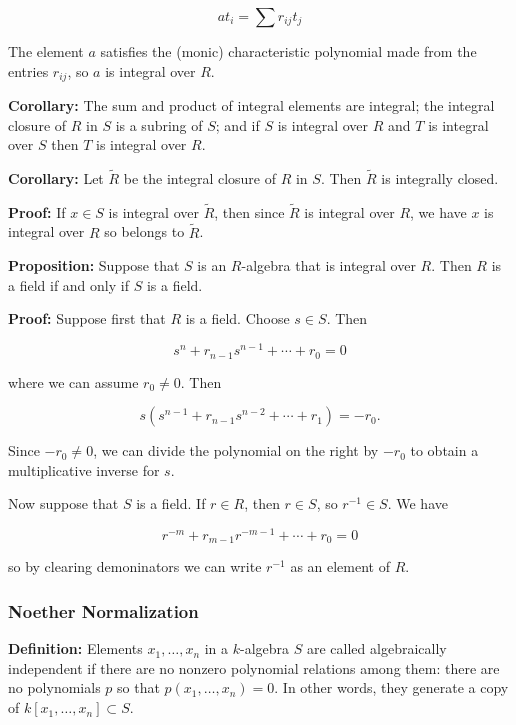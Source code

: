 \documentclass[]{article}
\begin{document}
\[
at_{i}=\sum r_{ij}t_{j}
\]

The element \(a\) satisfies the (monic) characteristic polynomial made
from the entries \(r_{ij}\), so \(a\) is integral over \(R\).

\textbf{Corollary:} The sum and product of integral elements are
integral; the integral closure of \(R\) in \(S\) is a subring of \(S\);
and if \(S\) is integral over \(R\) and \(T\) is integral over \(S\)
then \(T\) is integral over \(R\).

\textbf{Corollary:} Let \(\tilde{R}\) be the integral closure of \(R\)
in \(S\). Then \(\tilde{R}\) is integrally closed.

\textbf{Proof:} If \(x\in S\) is integral over \(\tilde{R}\), then since
\(\tilde{R}\) is integral over \(R\), we have \(x\) is integral over
\(R\) so belongs to \(\tilde{R}\).

\textbf{Proposition:} Suppose that \(S\) is an \(R\)-algebra that is
integral over \(R\). Then \(R\) is a field if and only if \(S\) is a
field.

\textbf{Proof:} Suppose first that \(R\) is a field. Choose \(s\in S\).
Then

\[
s^{n}+r_{n-1}s^{n-1}+\cdots+r_{0}=0
\]

where we can assume \(r_{0}\not=0\). Then

\[
s(s^{n-1}+r_{n-1}s^{n-2}+\cdots+r_{1})=-r_{0}.
\]

Since \(-r_0\not=0\), we can divide the polynomial on the right by
\(-r_{0}\) to obtain a multiplicative inverse for \(s\).

Now suppose that \(S\) is a field. If \(r\in R\), then \(r\in S\), so
\(r^{-1}\in S\). We have

\[
r^{-m}+r_{m-1}r^{-m-1}+\cdots+r_{0}=0
\]

so by clearing demoninators we can write \(r^{-1}\) as an element of
\(R\).

\hypertarget{noether-normalization}{%
\subsubsection{Noether Normalization}\label{noether-normalization}}

\textbf{Definition:} Elements \(x_1,\ldots, x_n\) in a \(k\)-algebra
\(S\) are called algebraically independent if there are no nonzero
polynomial relations among them: there are no polynomials \(p\) so that
\(p(x_1,\ldots, x_n)=0\). In other words, they generate a copy of
\(k[x_1,\ldots, x_n]\subset S\).
\end{document}
